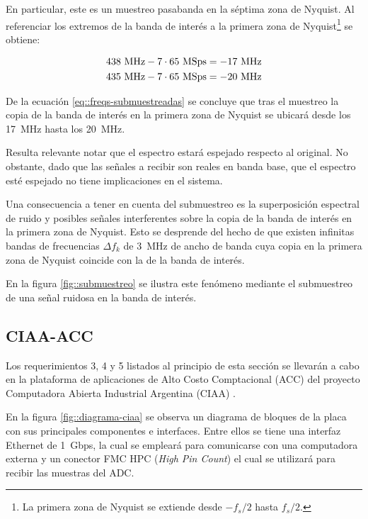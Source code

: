 \documentclass[../../main.tex]{subfiles}
\begin{document}
En particular, este es un muestreo pasabanda en la séptima zona de Nyquist. Al referenciar los extremos de la banda de interés a la primera zona de Nyquist\footnote{La primera zona de Nyquist se extiende desde $-f_s/2$ hasta $f_s/2$.} se obtiene:

\begin{equation}
\!
\begin{aligned}
438~\textrm{MHz} - 7 \cdot 65~\textrm{MSps} = -17~\textrm{MHz} \\
435~\textrm{MHz} - 7 \cdot 65~\textrm{MSps} = -20~\textrm{MHz} 
\end{aligned}
\label{eq::freqs-submuestreadas}
\end{equation}

De la ecuación \ref{eq::freqs-submuestreadas} se concluye que tras el muestreo la copia de la banda de interés en la primera zona de Nyquist se ubicará desde los 17~MHz hasta los 20~MHz. 

Resulta relevante notar que el espectro estará espejado respecto al original. No obstante, dado que las señales a recibir son reales en banda base, que el espectro esté espejado no tiene implicaciones en el sistema. 

Una consecuencia a tener en cuenta del submuestreo es la superposición espectral de ruido y posibles señales interferentes sobre la copia de la banda de interés en la primera zona de Nyquist. Esto se desprende del hecho de que existen infinitas bandas de frecuencias $\Delta f_k$ de 3~MHz de ancho de banda cuya copia en la primera zona de Nyquist coincide con la de la banda de interés.

En la figura \ref{fig::submuestreo} se ilustra este fenómeno mediante el submuestreo de una señal ruidosa en la banda de interés.



\subsection{CIAA-ACC}
Los requerimientos 3, 4 y 5 listados al principio de esta sección se llevarán a cabo en la plataforma de aplicaciones de Alto Costo Comptacional (ACC) \cite{CIAA-ACC} del proyecto Computadora Abierta Industrial Argentina (CIAA) \cite{CIAA}.


En la figura \ref{fig::diagrama-ciaa} se observa un diagrama de bloques de la placa con sus principales componentes e interfaces. Entre ellos se tiene una interfaz Ethernet de 1~Gbps, la cual se empleará para comunicarse con una computadora externa y un conector FMC HPC (\textit{High Pin Count}) el cual se utilizará para recibir las muestras del ADC.
\end{document}
